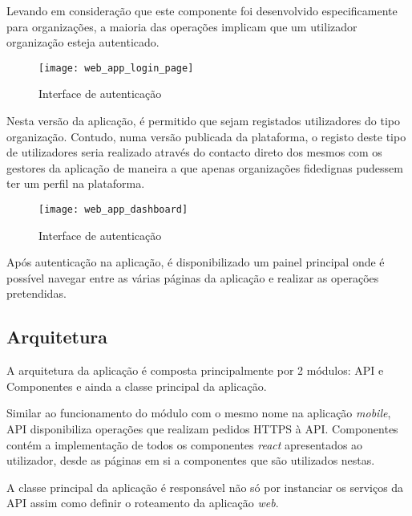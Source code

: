 Levando em consideração que este componente foi desenvolvido especificamente para organizações, a maioria das operações implicam que um utilizador organização esteja autenticado.

\begin{figure}[h]
	\centering
	\texttt{[image: web\_app\_login\_page]}
	\caption{Interface de autenticação}
\end{figure}

Nesta versão da aplicação, é permitido que sejam registados utilizadores do tipo organização. Contudo, numa versão publicada da plataforma, o registo deste tipo de utilizadores seria realizado através do contacto direto dos mesmos com os gestores da aplicação de maneira a que apenas organizações fidedignas pudessem ter um perfil na plataforma.

\par \medskip

\begin{figure}[h]
	\centering
	\texttt{[image: web\_app\_dashboard]}
	\caption{Interface de autenticação}
\end{figure}

Após autenticação na aplicação, é disponibilizado um painel principal onde é possível navegar entre as várias páginas da aplicação e realizar as operações pretendidas.

\par \medskip

\subsection{Arquitetura}

A arquitetura da aplicação é composta principalmente por 2 módulos: API e Componentes e ainda a classe principal da aplicação.

\par \medskip 

Similar ao funcionamento do módulo com o mesmo nome na aplicação \textit{mobile}, API disponibiliza operações que realizam pedidos HTTPS à API. Componentes contém a implementação de todos os componentes \textit{react} apresentados ao utilizador, desde as páginas em si a componentes que são utilizados nestas. 

\par \medskip

A classe principal da aplicação é responsável não só por instanciar os serviços da API assim como definir o roteamento da aplicação \textit{web}.

